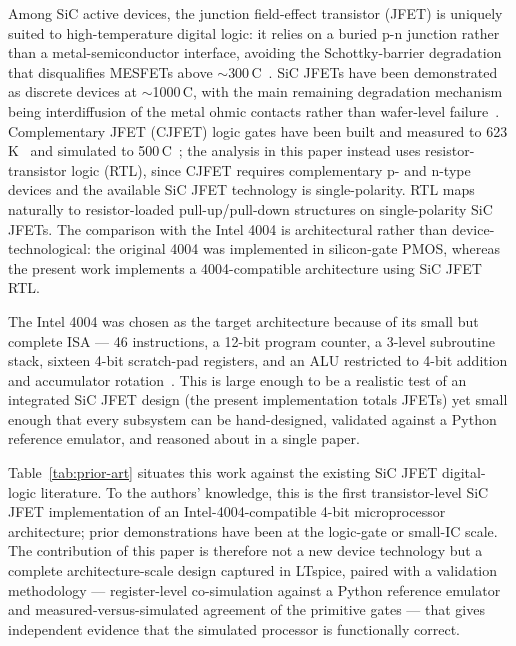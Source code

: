Among SiC active devices, the junction field-effect transistor (JFET) is uniquely suited to high-temperature digital logic: it relies on a buried p-n junction rather than a metal-semiconductor interface, avoiding the Schottky-barrier degradation that disqualifies MESFETs above $\sim$300\,\degree C~\cite{ZOLPER19982153}. SiC JFETs have been demonstrated as discrete devices at $\sim$1000\,\degree C, with the main remaining degradation mechanism being interdiffusion of the metal ohmic contacts rather than wafer-level failure~\cite{Neudeck2018}. Complementary JFET (CJFET) logic gates have been built and measured to 623\,K~\cite{9785630} and simulated to 500\,\degree C~\cite{Habib2013}; the analysis in this paper instead uses resistor-transistor logic (RTL), since CJFET requires complementary p- and n-type devices and the available SiC JFET technology is single-polarity. RTL maps naturally to resistor-loaded pull-up/pull-down structures on single-polarity SiC JFETs. The comparison with the Intel 4004 is architectural rather than device-technological: the original 4004 was implemented in silicon-gate PMOS, whereas the present work implements a 4004-compatible architecture using SiC JFET RTL.

The Intel 4004 was chosen as the target architecture because of its small but complete ISA --- 46 instructions, a 12-bit program counter, a 3-level subroutine stack, sixteen 4-bit scratch-pad registers, and an ALU restricted to 4-bit addition and accumulator rotation~\cite{Intel1973MCS4,Intel4004Specs}. This is large enough to be a realistic test of an integrated SiC JFET design (the present implementation totals \TotalJFETCount{} JFETs) yet small enough that every subsystem can be hand-designed, validated against a Python reference emulator, and reasoned about in a single paper.

Table~\ref{tab:prior-art} situates this work against the existing SiC JFET digital-logic literature. To the authors' knowledge, this is the first transistor-level SiC JFET implementation of an Intel-4004-compatible 4-bit microprocessor architecture; prior demonstrations have been at the logic-gate or small-IC scale. The contribution of this paper is therefore not a new device technology but a complete architecture-scale design captured in LTspice, paired with a validation methodology --- register-level co-simulation against a Python reference emulator and measured-versus-simulated agreement of the primitive gates --- that gives independent evidence that the simulated processor is functionally correct.

